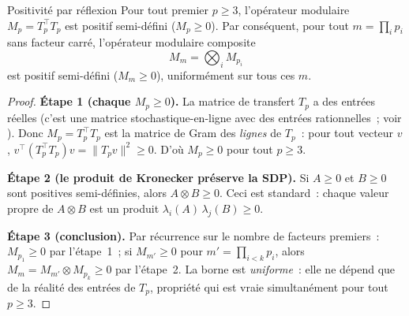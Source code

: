 \documentclass[12pt,a4paper]{article}
\begin{document}
\begin{thmbox}{Positivité par réflexion}
\label{thm:OS3_uniform}
\mBR
Pour tout premier $p \geq 3$, l'opérateur modulaire
$M_p = T_p^{\!\top} T_p$
est positif semi-défini ($M_p \geq 0$).
Par conséquent, pour tout $m = \prod_i p_i$ sans facteur carré,
l'opérateur modulaire composite
\[
  M_m = \bigotimes_i M_{p_i}
\]
est positif semi-défini ($M_m \geq 0$), uniformément sur tous ces
$m$.

\begin{proof}
\textbf{Étape 1 (chaque $M_p \geq 0$).}
La matrice de transfert $T_p$ a des entrées réelles (c'est une
matrice stochastique-en-ligne avec des entrées rationnelles~; voir
\cite{companion_M1}). Donc $M_p = T_p^{\!\top} T_p$ est la matrice
de Gram des \emph{lignes} de $T_p$~: pour tout vecteur $v$,
$v^{\!\top}(T_p^{\!\top} T_p)v = \|T_p v\|^2 \geq 0$.
D'où $M_p \geq 0$ pour tout $p \geq 3$.

\textbf{Étape 2 (le produit de Kronecker préserve la SDP).}
Si $A \geq 0$ et $B \geq 0$ sont positives semi-définies, alors
$A \otimes B \geq 0$. Ceci est standard~: chaque valeur propre de
$A \otimes B$ est un produit $\lambda_i(A)\,\lambda_j(B) \geq 0$.

\textbf{Étape 3 (conclusion).}
Par récurrence sur le nombre de facteurs premiers~: $M_{p_1} \geq 0$
par l'étape~1~; si $M_{m'} \geq 0$ pour $m' = \prod_{i<k} p_i$,
alors $M_m = M_{m'} \otimes M_{p_k} \geq 0$ par l'étape~2. La borne
est \emph{uniforme}~: elle ne dépend que de la réalité des entrées
de $T_p$, propriété qui est vraie simultanément pour tout
$p \geq 3$.
\end{proof}
\end{thmbox}
\end{document}
